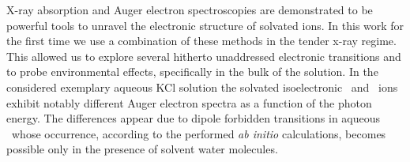 X-ray absorption and Auger electron spectroscopies are demonstrated to be powerful tools to unravel the electronic structure of solvated ions. In this work for the first time we use a combination of these methods in the tender x-ray regime. This allowed us to explore several hitherto unaddressed electronic transitions and to probe environmental effects, specifically in the bulk of the solution. In the considered exemplary aqueous KCl solution the solvated isoelectronic \ki~and \cli~ions exhibit notably different Auger electron spectra as a function of the photon energy. The differences appear due to dipole forbidden transitions in aqueous \ki~whose occurrence, according to the performed {\it ab initio} calculations, becomes possible only in the presence of solvent water molecules.